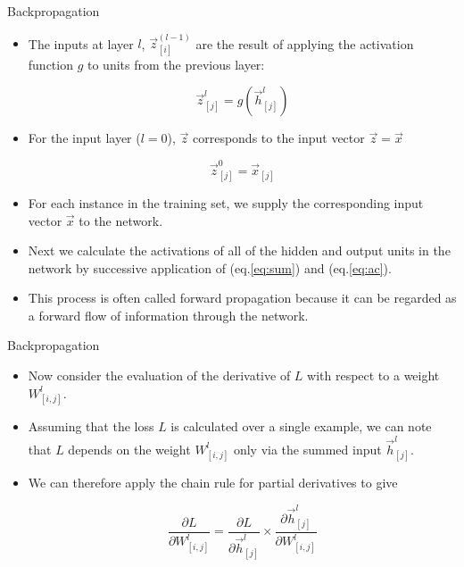 \documentclass[handout]{beamer}
\begin{document}
\begin{frame}{Backpropagation}
\begin{scriptsize}


\begin{itemize}

\item The inputs at layer $l$, $\vec{z}_{[i]}^{(l-1)}$ are the result of applying the activation function $g$ to units from the previous layer:

\begin{equation}
\vec{z}_{[j]}^{l} = g(\vec{h}_{[j]}^{l})
\label{eq:ac}
\end{equation}

\item For the input layer ($l=0$), $\vec{z}$ corresponds to the input vector $\vec{z} = \vec{x}$ 

\begin{equation}
\vec{z}_{[j]}^0 = \vec{x}_{[j]}
\end{equation}

\item For each instance in the training set, we supply the corresponding input vector $\vec{x}$ to the network.
\item Next we calculate the activations of all of the hidden and output units in the network by successive application of (eq.\ref{eq:sum}) and (eq.\ref{eq:ac}). 

\item This process is often called forward propagation because it can be regarded
as a forward flow of information through the network.

\end{itemize}


\end{scriptsize}
\end{frame}


\begin{frame}{Backpropagation}
\begin{scriptsize}


\begin{itemize}

\item Now consider the evaluation of the derivative of $L$ with respect to a weight
$W_{[i,j]}^l$.

\item Assuming that the loss $L$ is calculated over a single example, we can note that $L$ depends on the weight $W_{[i,j]}^l$ only via the summed input $\vec{h}_{[j]}^{l}$.


\item We can therefore apply the chain rule for partial derivatives to give

\begin{equation}
\frac{\partial L}{\partial W_{[i,j]}^l} = \frac{\partial L}{\partial \vec{h}_{[j]}^{l}} \times \frac{\partial \vec{h}_{[j]}^{l}}{\partial W_{[i,j]}^l}
\label{eq:chain}
\end{equation}

\end{itemize}


\end{scriptsize}
\end{frame}
\end{document}
